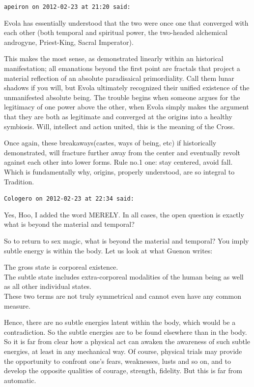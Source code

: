 \begin{footnotesize}
\begin{sffamily}
\hfill

\texttt{apeiron on 2012-02-23 at 21:20 said:}

Evola has essentially understood that the two were once one that converged with each other (both temporal and spiritual power, the two-headed alchemical androgyne, Priest-King, Sacral Imperator).

This makes the most sense, as demonstrated linearly within an historical manifestation; all emanations beyond the first point are fractals that project a material reflection of an absolute paradisaical primordiality. Call them lunar shadows if you will, but Evola ultimately recognized their unified existence of the unmanifested absolute being. The trouble begins when someone argues for the legitimacy of one power above the other, when Evola simply makes the argument that they are both as legitimate and converged at the origins into a healthy symbiosis. Will, intellect and action united, this is the meaning of the Cross.

Once again, these breakaways(castes, ways of being, etc) if historically demonstrated, will fracture further away from the center and eventually revolt against each other into lower forms. Rule no.1 one: stay centered, avoid fall. Which is fundamentally why, origins, properly understood, are so integral to Tradition.

\hfill

\texttt{Cologero on 2012-02-23 at 22:34 said:}

Yes, Hoo, I added the word MERELY. In all cases, the open question is exactly what is beyond the material and temporal?

So to return to sex magic, what is beyond the material and temporal? You imply subtle energy is within the body. Let us look at what Guenon writes:

The gross state is corporeal existence.\\ The subtle state includes extra-corporeal modalities of the human being as well as all other individual states.\\ These two terms are not truly symmetrical and cannot even have any common measure.

Hence, there are no subtle energies latent within the body, which would be a contradiction. So the subtle energies are to be found elsewhere than in the body. So it is far from clear how a physical act can awaken the awareness of such subtle energies, at least in any mechanical way. Of course, physical trials may provide the opportunity to confront one's fears, weaknesses, lusts and so on, and to develop the opposite qualities of courage, strength, fidelity. But this is far from automatic.


\end{sffamily}
\end{footnotesize}
